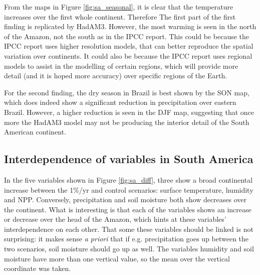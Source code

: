 \documentclass{article}
\begin{document}
From the maps in Figure \ref{fig:sa_seasonal}, it is clear that the temperature increases over the first whole continent. Therefore The first part of the first finding is replicated by HadAM3. However, the most warming is seen in the north of the Amazon, not the south as in the IPCC report. This could be because the IPCC report uses higher resolution models, that can better reproduce the spatial variation over continents. It could also be because the IPCC report uses regional models to assist in the modelling of certain regions, which will provide more detail (and it is hoped more accuracy) over specific regions of the Earth.

For the second finding, the dry season in Brazil is best shown by the SON map, which does indeed show a significant reduction in precipitation over eastern Brazil. However, a higher reduction is seen in the DJF map, suggesting that once more the HadAM3 model may not be producing the interior detail of the South American continent.

\newpage

\subsection{Interdependence of variables in South America}

In the five variables shown in Figure \ref{fig:sa_diff}, three show a broad continental increase between the 1\%/yr and control scenarios: surface temperature, humidity and NPP. Conversely, precipitation and soil moisture both show decreases over the continent. What is interesting is that each of the variables shows an increase or decrease over the head of the Amazon, which hints at these variables' interdependence on each other. That some these variables should be linked is not surprising: it makes sense \textit{a priori} that if e.g. precipitation goes up between the two scenarios, soil moisture should go up as well. The variables humidity and soil moisture have more than one vertical value, so the mean over the vertical coordinate was taken.
\end{document}
